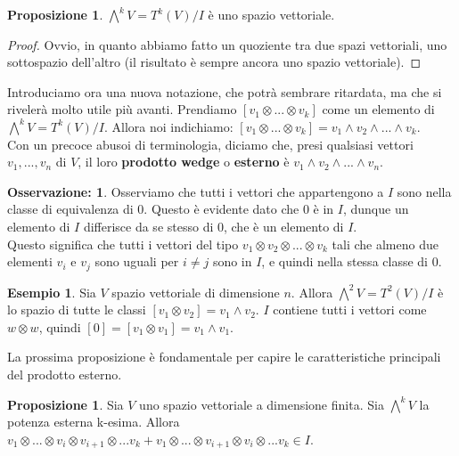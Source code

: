 \documentclass[12pt,a4paper]{report}
\theoremstyle{definition}
\theoremstyle{Theorem}
\newtheorem{Prop}[Def]{Proposizione}
\theoremstyle{definition}
\newtheorem{Ex}[Def]{Esempio}
\theoremstyle{definition}
\theoremstyle{definition}
\newtheorem{Obs}[Def]{Osservazione:}
\begin{document}
\begin{Prop}
	$\bigwedge^k V=T^k(V)/I$ è uno spazio vettoriale.
\end{Prop}
\begin{proof}
	Ovvio, in quanto abbiamo fatto un quoziente tra due spazi vettoriali, uno sottospazio dell'altro (il risultato è sempre ancora uno spazio vettoriale).
	\end{proof}
	Introduciamo ora una nuova notazione, che potrà sembrare ritardata, ma che si rivelerà molto utile più avanti.
	Prendiamo $[v_1\otimes...\otimes v_k]$ come un elemento di $\bigwedge^k V=T^k(V)/I$. Allora noi indichiamo: $[v_1\otimes...\otimes v_k]=v_1\wedge v_2 \wedge...\wedge v_k$.\\
	Con un precoce abusoi di terminologia, diciamo che, presi qualsiasi vettori $v_1,...,v_n$ di $V$, il loro \textbf{prodotto wedge} o \textbf{esterno} è $v_1\wedge v_2 \wedge...\wedge v_n$.    
	\begin{Obs}
		Osserviamo che tutti i vettori che appartengono a $I$ sono nella classe di equivalenza di $0$. Questo è evidente dato che $0$ è in $I$, dunque un elemento di $I$ differisce da se stesso di $0$, che è un elemento di $I$.\\
		Questo significa che tutti i vettori del tipo $v_1\otimes v_2\otimes...\otimes v_k$ tali che almeno due elementi $v_i$ e $v_j$ sono uguali per $i\neq j$ sono in $I$, e quindi nella stessa classe di $0$.
	\end{Obs}
	\begin{Ex}
		Sia $V$ spazio vettoriale di dimensione $n$. Allora $\bigwedge^2 V=T^2(V)/I$ è lo spazio di tutte le classi $[v_1\otimes v_2]=v_1\wedge v_2$. $I$ contiene tutti i vettori come $w\otimes w$, quindi $[0]=[v_1\otimes v_1]=v_1\wedge v_1$.
	\end{Ex}
	La prossima proposizione è fondamentale per capire le caratteristiche principali del prodotto esterno.
	\begin{Prop}
		Sia $V$ uno spazio vettoriale a dimensione finita. Sia $\bigwedge^k V$ la potenza esterna k-esima. Allora $v_1\otimes ...\otimes v_i\otimes v_{i+1}\otimes... v_k+v_1\otimes ...\otimes v_{i+1}\otimes v_{i}\otimes... v_k\in I$.
	\end{Prop}
\end{document}
